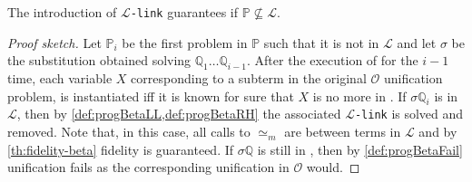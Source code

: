 \documentclass[sigconf,natbib=false,review]{acmart}
\newcommand{\UnifRel}{\ensuremath{\simeq}}
\newcommand{\Ue}{\ensuremath{\UnifRel_m}\xspace}
\newcommand{\llambda}{\ensuremath{\mathcal{L}}\xspace}
\newcommand{\linkMacro}[1]{\ensuremath{#1}\texttt{-link}\xspace}
\newcommand{\linkbeta}{\linkMacro{\llambda}}
\newcommand{\Fo}{\texorpdfstring{\ensuremath{\mathcal{O}}\xspace}{O}}
\newcommand{\foUnifPb}{\ensuremath{\mathbb{P}}\xspace}
\newcommand{\hoUnifPb}{\ensuremath{\mathbb{Q}}\xspace}
\begin{document}
\begin{theorem}[Fidelity in \Fo]
  The introduction of \linkbeta guarantees 
  if $\foUnifPb \not\subseteq \llambda$.
\end{theorem}

\begin{proof}[Proof sketch]
  Let $\foUnifPb_i$ be the first problem in \foUnifPb{} such that it is not in \llambda and let
  $\sigma$ be the substitution obtained solving
  $\hoUnifPb_1\ldots\hoUnifPb_{i-1}$. After the execution of \hstep
  for the $i-1$ time,
  each variable $X$ corresponding to a \maybeeta subterm in the original \Fo 
  unification problem, is instantiated iff it is known for sure
  that $X$ is no more in \maybeeta. If $\sigma\hoUnifPb_i$ is in \llambda, then 
  by \cref{def:progBetaLL,def:progBetaRH} the associated \linkbeta
  is solved and removed. Note that, in this case, all
  calls to \Ue{} are between terms in \llambda and by \cref{th:fidelity-beta}
  fidelity is guaranteed. If $\sigma\hoUnifPb$ is still in \notllambda,
  then by \cref{def:progBetaFail} unification fails as the
  corresponding unification in \Fo{} would.
\end{proof}
\end{document}
